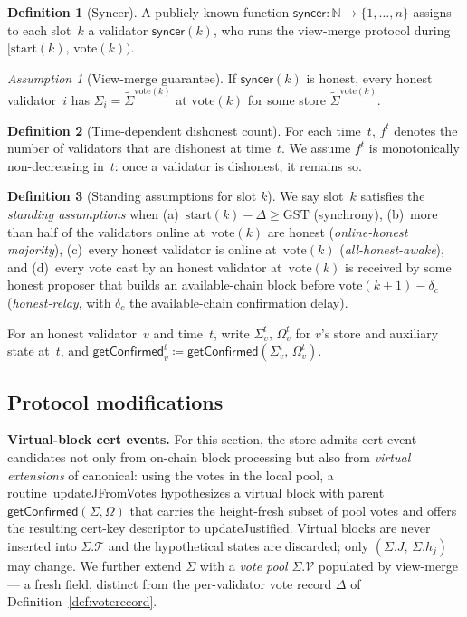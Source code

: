 \documentclass{article}
\newcommand{\T}[0]{\ensuremath{\mathcal{T}}}
\newcommand{\updateJFromVotes}{\textsf{updateJFromVotes}\xspace}
\newcommand{\start}{\ensuremath{\mathrm{start}}}
\newcommand{\vote}{\ensuremath{\mathrm{vote}}}
\newcommand{\GST}{\ensuremath{\mathrm{GST}}\xspace}
\newcommand{\comm}[1]{\ensuremath{\widetilde{#1}}}
\newcommand{\syncer}{\textsf{syncer}\xspace}
\newcommand{\updateJustified}{\textsf{updateJustified}\xspace}
\newcommand{\getConfirmed}{\textsf{getConfirmed}\xspace}
\renewcommand{\paragraph}[1]{\vspace{7pt}\noindent\textbf{#1}}
\theoremstyle{plain}
\theoremstyle{definition}
\newtheorem{definition}{Definition}
\theoremstyle{remark}
\newtheorem{assumption}[theorem]{Assumption}
\begin{document}
\begin{definition}[Syncer]\label{def:syncer}
A publicly known function $\syncer \colon \mathbb{N} \to \{1, \ldots, n\}$ assigns to each slot~$k$ a validator $\syncer(k)$, who runs the view-merge protocol during $[\start(k),\, \vote(k))$.
\end{definition}

\begin{assumption}[View-merge guarantee]\label{ass:view-merge}
If $\syncer(k)$ is honest, every honest validator~$i$ has $\Sigma_i = \comm{\Sigma}^{\vote(k)}$ at $\vote(k)$ for some store $\comm{\Sigma}^{\vote(k)}$.
\end{assumption}

\begin{definition}[Time-dependent dishonest count]\label{rev:def:f-t}
For each time~$t$, $f^t$ denotes the number of validators that are dishonest at time~$t$. We assume $f^t$ is monotonically non-decreasing in~$t$: once a validator is dishonest, it remains so.
\end{definition}

\begin{definition}[Standing assumptions for slot $k$]\label{def:standing}
We say slot~$k$ satisfies the \emph{standing assumptions} when (a)~$\start(k) - \Delta \geq \GST$ (synchrony), (b)~more than half of the validators online at~$\vote(k)$ are honest (\emph{online-honest majority}), (c)~every honest validator is online at~$\vote(k)$ (\emph{all-honest-awake}), and (d)~every vote cast by an honest validator at~$\vote(k)$ is received by some honest proposer that builds an available-chain block before $\vote(k+1) - \delta_c$ (\emph{honest-relay}, with $\delta_c$ the available-chain confirmation delay).
\end{definition}

For an honest validator~$v$ and time~$t$, write $\Sigma_v^t,\, \Omega_v^t$ for $v$'s store and auxiliary state at~$t$, and $\getConfirmed_v^t \coloneqq \getConfirmed(\Sigma_v^t,\, \Omega_v^t)$.

\subsection{Protocol modifications}

\paragraph{Virtual-block cert events.}
For this section, the store admits cert-event candidates not only from on-chain block processing but also from \emph{virtual extensions} of canonical: using the votes in the local pool, a routine~\updateJFromVotes hypothesizes a virtual block with parent~$\getConfirmed(\Sigma,\Omega)$ that carries the height-fresh subset of pool votes and offers the resulting cert-key descriptor to \updateJustified.
Virtual blocks are never inserted into $\Sigma.\T$ and the hypothetical states are discarded; only $(\Sigma.J,\, \Sigma.h_j)$ may change.
We further extend $\Sigma$ with a \emph{vote pool} $\Sigma.\mathcal{V}$ populated by view-merge --- a fresh field, distinct from the per-validator vote record $\Delta$ of Definition~\ref{def:voterecord}.
\end{document}
